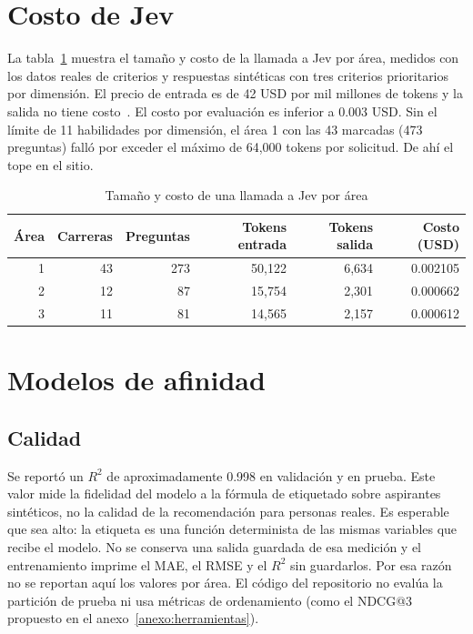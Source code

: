 \section{Costo de Jev}
La tabla~\ref{tab:costo-jev} muestra el tamaño y costo de la llamada a Jev por área, medidos con los datos reales de criterios y respuestas sintéticas con tres criterios prioritarios por dimensión. El precio de entrada es de 42 USD por mil millones de tokens y la salida no tiene costo~\cite{JevAPI2026}. El costo por evaluación es inferior a 0.003 USD. Sin el límite de 11 habilidades por dimensión, el área 1 con las 43 marcadas (473 preguntas) falló por exceder el máximo de 64,000 tokens por solicitud. De ahí el tope en el sitio.

\begin{table}[H]
\centering
\small
\renewcommand{\arraystretch}{1.2}
\caption{Tamaño y costo de una llamada a Jev por área}
\label{tab:costo-jev}
\begin{tabular}{rrrrrr}
\toprule
\rowcolor{encabezadoTabla} \color{white}\textbf{Área} & \color{white}\textbf{Carreras} & \color{white}\textbf{Preguntas} & \color{white}\textbf{Tokens entrada} & \color{white}\textbf{Tokens salida} & \color{white}\textbf{Costo (USD)} \\
\midrule
1 & 43 & 273 & 50,122 & 6,634 & 0.002105 \\
\rowcolor{filaAlterna}
2 & 12 & 87 & 15,754 & 2,301 & 0.000662 \\
3 & 11 & 81 & 14,565 & 2,157 & 0.000612 \\
\bottomrule
\end{tabular}
\end{table}

\section{Modelos de afinidad}
\subsection{Calidad}
Se reportó un $R^2$ de aproximadamente 0.998 en validación y en prueba. Este valor mide la fidelidad del modelo a la fórmula de etiquetado sobre aspirantes sintéticos, no la calidad de la recomendación para personas reales. Es esperable que sea alto: la etiqueta es una función determinista de las mismas variables que recibe el modelo. No se conserva una salida guardada de esa medición y el entrenamiento imprime el MAE, el RMSE y el $R^2$ sin guardarlos. Por esa razón no se reportan aquí los valores por área. El código del repositorio no evalúa la partición de prueba ni usa métricas de ordenamiento (como el NDCG@3 propuesto en el anexo~\ref{anexo:herramientas}).

